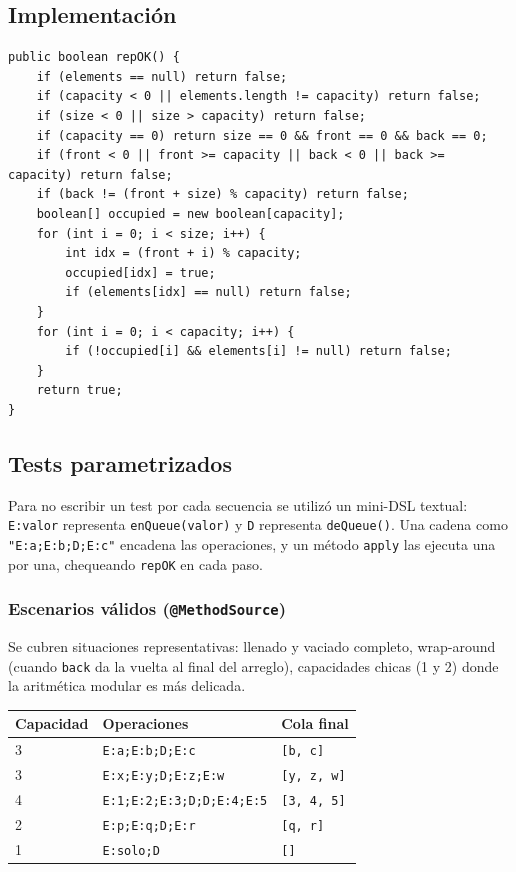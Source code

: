 \documentclass[12pt,a4paper]{article}
\begin{document}
\subsection{Implementación}
\begin{lstlisting}[style=javastyle]
public boolean repOK() {
    if (elements == null) return false;
    if (capacity < 0 || elements.length != capacity) return false;
    if (size < 0 || size > capacity) return false;
    if (capacity == 0) return size == 0 && front == 0 && back == 0;
    if (front < 0 || front >= capacity || back < 0 || back >= capacity) return false;
    if (back != (front + size) % capacity) return false;
    boolean[] occupied = new boolean[capacity];
    for (int i = 0; i < size; i++) {
        int idx = (front + i) % capacity;
        occupied[idx] = true;
        if (elements[idx] == null) return false;
    }
    for (int i = 0; i < capacity; i++) {
        if (!occupied[i] && elements[i] != null) return false;
    }
    return true;
}
\end{lstlisting}

\subsection{Tests parametrizados}
Para no escribir un test por cada secuencia se utilizó un mini-DSL textual: \texttt{E:valor} representa \texttt{enQueue(valor)} y \texttt{D} representa \texttt{deQueue()}. Una cadena como \texttt{"E:a;E:b;D;E:c"} encadena las operaciones, y un método \texttt{apply} las ejecuta una por una, chequeando \texttt{repOK} en cada paso.

\subsubsection*{Escenarios válidos (\texttt{@MethodSource})}
Se cubren situaciones representativas: llenado y vaciado completo, wrap-around (cuando \texttt{back} da la vuelta al final del arreglo), capacidades chicas (1 y 2) donde la aritmética modular es más delicada.

\begin{center}
\begin{tabular}{lll}
\toprule
Capacidad & Operaciones & Cola final \\
\midrule
3 & \texttt{E:a;E:b;D;E:c}           & \texttt{[b, c]}       \\
3 & \texttt{E:x;E:y;D;E:z;E:w}       & \texttt{[y, z, w]}    \\
4 & \texttt{E:1;E:2;E:3;D;D;E:4;E:5} & \texttt{[3, 4, 5]}    \\
2 & \texttt{E:p;E:q;D;E:r}           & \texttt{[q, r]}       \\
1 & \texttt{E:solo;D}                & \texttt{[]}           \\
\bottomrule
\end{tabular}
\end{center}
\end{document}
